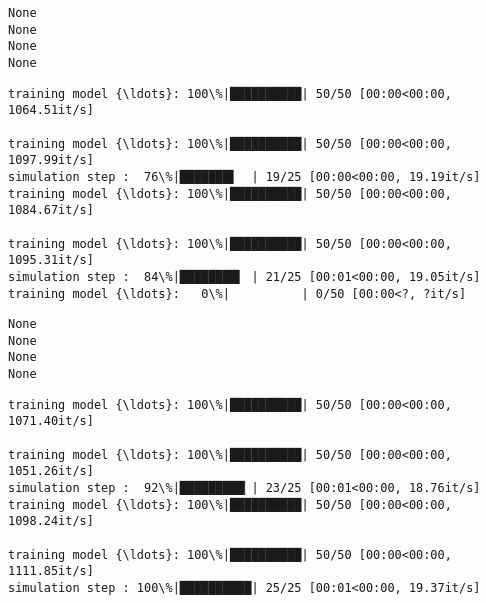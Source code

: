 \documentclass[11pt]{article}
\begin{document}
    \begin{Verbatim}[commandchars=\\\{\}]
None
None
None
None
    \end{Verbatim}

    \begin{Verbatim}[commandchars=\\\{\}]
training model {\ldots}: 100\%|██████████| 50/50 [00:00<00:00, 1064.51it/s]

training model {\ldots}: 100\%|██████████| 50/50 [00:00<00:00, 1097.99it/s]
simulation step :  76\%|███████▌  | 19/25 [00:00<00:00, 19.19it/s]
training model {\ldots}: 100\%|██████████| 50/50 [00:00<00:00, 1084.67it/s]

training model {\ldots}: 100\%|██████████| 50/50 [00:00<00:00, 1095.31it/s]
simulation step :  84\%|████████▍ | 21/25 [00:01<00:00, 19.05it/s]
training model {\ldots}:   0\%|          | 0/50 [00:00<?, ?it/s]
    \end{Verbatim}

    \begin{Verbatim}[commandchars=\\\{\}]
None
None
None
None
    \end{Verbatim}

    \begin{Verbatim}[commandchars=\\\{\}]
training model {\ldots}: 100\%|██████████| 50/50 [00:00<00:00, 1071.40it/s]

training model {\ldots}: 100\%|██████████| 50/50 [00:00<00:00, 1051.26it/s]
simulation step :  92\%|█████████▏| 23/25 [00:01<00:00, 18.76it/s]
training model {\ldots}: 100\%|██████████| 50/50 [00:00<00:00, 1098.24it/s]

training model {\ldots}: 100\%|██████████| 50/50 [00:00<00:00, 1111.85it/s]
simulation step : 100\%|██████████| 25/25 [00:01<00:00, 19.37it/s]
    \end{Verbatim}
\end{document}
